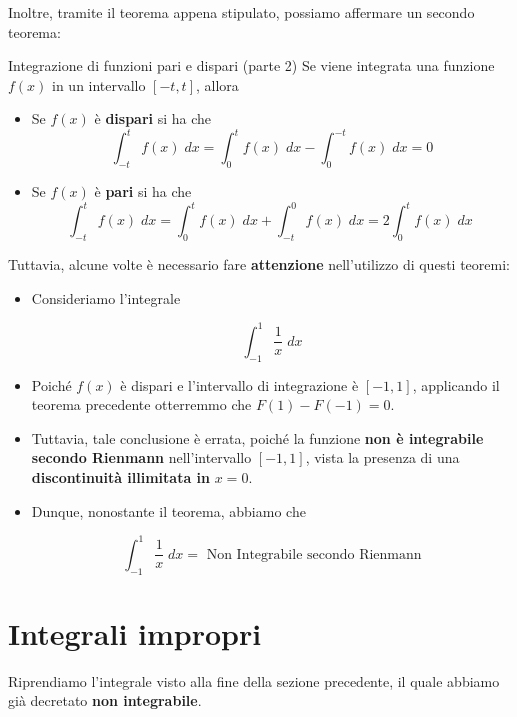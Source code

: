 \documentclass[a4paper, 12pt]{report}
\begin{document}
    Inoltre, tramite il teorema appena stipulato, possiamo affermare un secondo teorema:
    
    \begin{framedthm}{Integrazione di funzioni pari e dispari (parte 2)}
        Se viene integrata una funzione $f(x)$ in un intervallo $[-t, t]$, allora
        \begin{itemize}
            \item Se $f(x)$ è \textbf{dispari} si ha che
            \[ \int_{-t}^{t} f(x) \; dx = \int_{0}^{t} f(x) \; dx - \int_{0}^{-t} f(x) \; dx = 0\]
            \item Se $f(x)$ è \textbf{pari} si ha che
            \[ \int_{-t}^{t} f(x) \; dx = \int_{0}^{t} f(x) \; dx + \int_{-t}^{0} f(x) \; dx =2\int_{0}^{t} f(x) \; dx \;\]
        \end{itemize}
    \end{framedthm}
    
    Tuttavia, alcune volte è necessario fare \textbf{attenzione} nell'utilizzo di questi teoremi:
    
    \begin{itemize}
        \item Consideriamo l'integrale
        
        \[ \int_{-1}^{1} \frac{1}{x} \; dx\]
        
        \item Poiché $f(x)$ è dispari e l'intervallo di integrazione è $[-1, 1]$, applicando il teorema precedente otterremmo che $F(1) - F(-1) = 0$.
        
        \item Tuttavia, tale conclusione è errata, poiché la funzione \textbf{non è integrabile secondo Rienmann} nell'intervallo $[-1, 1]$, vista la presenza di una \textbf{discontinuità illimitata in } $x = 0$.
        
        \item Dunque, nonostante il teorema, abbiamo che
        
        \[ \int_{-1}^{1} \frac{1}{x} \; dx = \text{ Non Integrabile secondo Rienmann}\]
    \end{itemize}
    
    \newpage
    
    \section{Integrali impropri}
    
    Riprendiamo l'integrale visto alla fine della sezione precedente, il quale abbiamo già decretato \textbf{non integrabile}.
    
\end{document}
